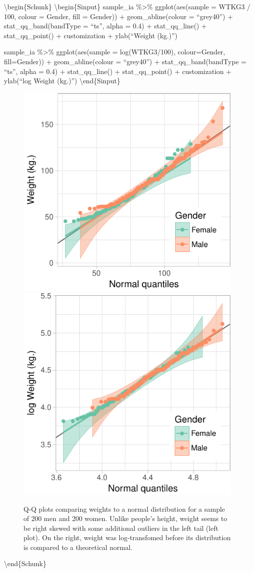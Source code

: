 \textbackslash{}begin\{Schunk\} \textbackslash{}begin\{Sinput\}
sample\_ia \%\textgreater{}\% ggplot(aes(sample = WTKG3 / 100, colour =
Gender, fill = Gender)) + geom\_abline(colour = ``grey40'') +
stat\_qq\_band(bandType = ``ts'', alpha = 0.4) + stat\_qq\_line() +
stat\_qq\_point() + customization + ylab(``Weight (kg.)'')

sample\_ia \%\textgreater{}\% ggplot(aes(sample = log(WTKG3/100),
colour=Gender, fill=Gender)) + geom\_abline(colour = ``grey40'') +
stat\_qq\_band(bandType = ``ts'', alpha = 0.4) + stat\_qq\_line() +
stat\_qq\_point() + customization + ylab(``log Weight (kg.)'')
\textbackslash{}end\{Sinput\}

\begin{figure}

{\centering \includegraphics[width=0.4\linewidth]{loy-figures/weights-1} \includegraphics[width=0.4\linewidth]{loy-figures/weights-2} 

}

\caption[Q-Q plots comparing weights to a normal distribution for a sample of 200 men and 200 women]{Q-Q plots comparing weights to a normal distribution for a sample of 200 men and 200 women. Unlike people's height, weight seems to be right skewed with some additional outliers in the left tail (left plot). On the right, weight was log-transfomed before its distribution is compared to a theoretical normal. }\label{fig:weights}
\end{figure}

\textbackslash{}end\{Schunk\}

